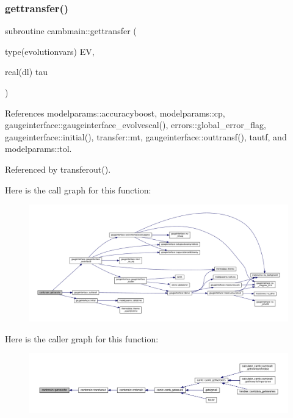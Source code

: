 \subsubsection{\texorpdfstring{gettransfer()}{gettransfer()}}
{\footnotesize\ttfamily subroutine cambmain\+::gettransfer (\begin{DoxyParamCaption}\item[{type(evolutionvars)}]{EV,  }\item[{real(dl)}]{tau }\end{DoxyParamCaption})\hspace{0.3cm}{\ttfamily [private]}}



References modelparams\+::accuracyboost, modelparams\+::cp, gaugeinterface\+::gaugeinterface\+\_\+evolvescal(), errors\+::global\+\_\+error\+\_\+flag, gaugeinterface\+::initial(), transfer\+::mt, gaugeinterface\+::outtransf(), tautf, and modelparams\+::tol.



Referenced by transferout().

Here is the call graph for this function\+:
\nopagebreak
\begin{figure}[H]
\begin{center}
\leavevmode
\includegraphics[width=350pt]{namespacecambmain_ac9e5e052a53e579f43f980836baee5be_cgraph}
\end{center}
\end{figure}
Here is the caller graph for this function\+:
\nopagebreak
\begin{figure}[H]
\begin{center}
\leavevmode
\includegraphics[width=350pt]{namespacecambmain_ac9e5e052a53e579f43f980836baee5be_icgraph}
\end{center}
\end{figure}
\mbox{\label{namespacecambmain_a4af989c7e3c97477fc61f6b31dd053e7}} 
